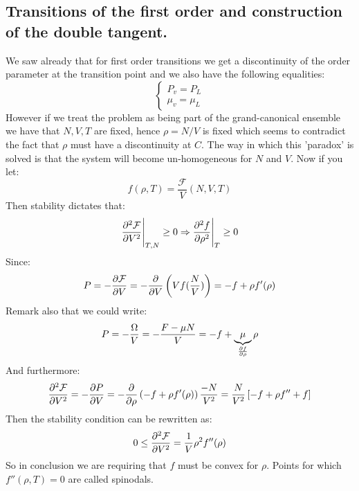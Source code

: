 \documentclass[10pt,a4paper]{book}
\begin{document}
\subsection{Transitions of the first order and construction of the double tangent.}
We saw already that for first order transitions we get a discontinuity of the order parameter at the transition point and we also have the following equalities:
\[
\begin{cases}
P_v = P_L\\
\mu_v = \mu_L
\end{cases}
\]
However if we treat the problem as being part of the grand-canonical ensemble we have that $N, V, T$ are fixed, hence $\rho = N/V$ is fixed which seems to contradict the fact that $\rho$ must have a discontinuity at $C$. The way in which this 'paradox' is solved is that the system will become un-homogeneous for $N$ and $V$. Now if you let:
\[
f(\rho, T) = \frac{\mathcal{F}}{V}(N, V, T)
\]
Then stability dictates that:
\[
\pdv[2]{\mathcal{F}}{V} \Bigg|_{T, N} \geq 0 \Rightarrow \pdv[2]{f}{\rho} \Bigg|_T \geq 0
\]
Since:
\[
P = -\pdv{\mathcal{F}}{V} = - \pdv{}{V}\left(V f(\frac{N}{V})\right) = - f + \rho f'(\rho)
\]
Remark also that we could write:
\[
P = - \frac{\Omega}{V} = - \frac{F - \mu N}{V} = -f + \underbrace{\mu}_{\pdv{f}{\rho}} \rho
\]
And furthermore:
\[
\pdv[2]{\mathcal{F}}{V} = - \pdv{P}{V} = - \pdv{}{\rho}\left(-f + \rho f'(\rho)\right) \frac{-N}{V^2} = \frac{N}{V^2}\left[ -f + \rho f'' + f \right]
\]
Then the stability condition can be rewritten as:
\[
0 \leq \pdv[2]{\mathcal{F}}{V} = \frac{1}{V} \rho^2 f''(\rho)
\]
So in conclusion we are requiring that $f$ must be convex for $\rho$. Points for which $f''(\rho, T) = 0$ are called spinodals.
\end{document}
